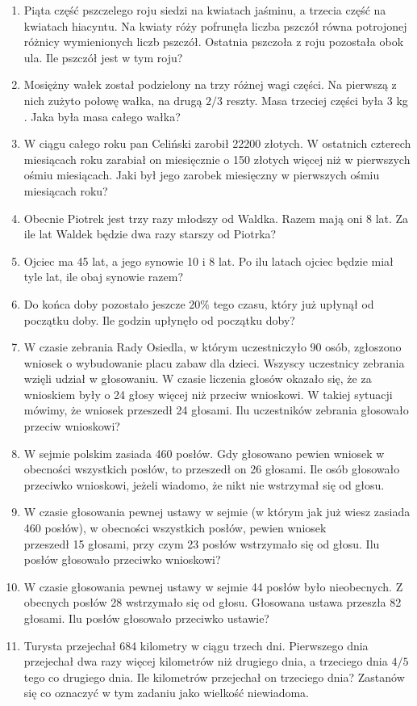 \documentclass[10pt]{article}
\begin{document}
\begin{enumerate}
  \item Piąta część pszczelego roju siedzi na kwiatach jaśminu, a trzecia część na kwiatach hiacyntu. Na kwiaty róży pofrunęła liczba pszczół równa potrojonej różnicy wymienionych liczb pszczół. Ostatnia pszczoła z roju pozostała obok ula. Ile pszczół jest w tym roju?
  \item Mosiężny wałek został podzielony na trzy różnej wagi części. Na pierwszą z nich zużyto połowę wałka, na drugą \(2 / 3\) reszty. Masa trzeciej części była 3 kg . Jaka była masa całego wałka?
  \item W ciągu całego roku pan Celiński zarobił 22200 złotych. W ostatnich czterech miesiącach roku zarabiał on miesięcznie o 150 złotych więcej niż w pierwszych ośmiu miesiącach. Jaki był jego zarobek miesięczny w pierwszych ośmiu miesiącach roku?
  \item Obecnie Piotrek jest trzy razy młodszy od Waldka. Razem mają oni 8 lat. Za ile lat Waldek będzie dwa razy starszy od Piotrka?
  \item Ojciec ma 45 lat, a jego synowie 10 i 8 lat. Po ilu latach ojciec będzie miał tyle lat, ile obaj synowie razem?
  \item Do końca doby pozostało jeszcze \(20 \%\) tego czasu, który już upłynął od początku doby. Ile godzin upłynęło od początku doby?
  \item W czasie zebrania Rady Osiedla, w którym uczestniczyło 90 osób, zgłoszono wniosek o wybudowanie placu zabaw dla dzieci. Wszyscy uczestnicy zebrania wzięli udział w głosowaniu. W czasie liczenia głosów okazało się, że za wnioskiem były o 24 głosy więcej niż przeciw wnioskowi. W takiej sytuacji mówimy, że wniosek przeszedł 24 głosami. Ilu uczestników zebrania głosowało przeciw wnioskowi?
  \item W sejmie polskim zasiada 460 posłów. Gdy głosowano pewien wniosek w obecności wszystkich posłów, to przeszedł on 26 głosami. Ile osób głosowało przeciwko wnioskowi, jeżeli wiadomo, że nikt nie wstrzymał się od głosu.
  \item W czasie głosowania pewnej ustawy w sejmie (w którym jak już wiesz zasiada 460 posłów), w obecności wszystkich posłów, pewien wniosek\\
przeszedł 15 głosami, przy czym 23 posłów wstrzymało się od głosu. Ilu posłów głosowało przeciwko wnioskowi?
  \item W czasie głosowania pewnej ustawy w sejmie 44 posłów było nieobecnych. Z obecnych posłów 28 wstrzymało się od głosu. Głosowana ustawa przeszła 82 głosami. Ilu posłów głosowało przeciwko ustawie?
  \item Turysta przejechał 684 kilometry w ciągu trzech dni. Pierwszego dnia przejechał dwa razy więcej kilometrów niż drugiego dnia, a trzeciego dnia \(4 / 5\) tego co drugiego dnia. Ile kilometrów przejechał on trzeciego dnia? Zastanów się co oznaczyć w tym zadaniu jako wielkość niewiadoma.
\end{enumerate}
\end{document}
